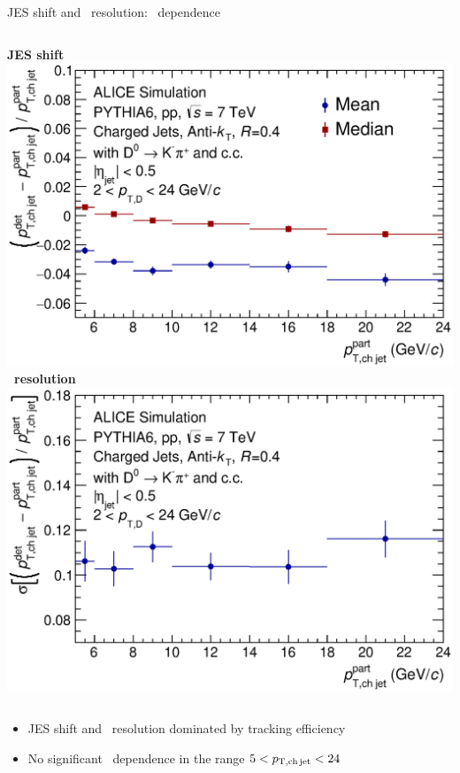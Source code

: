 \documentclass[xcolor={usenames,dvipsnames}]{beamer}
\begin{document}
\begin{frame}{JES shift and \pt\ resolution: \pt\ dependence}
\begin{columns}
\centering
\textbf{JES shift}\\
\includegraphics[width=\textwidth]{img/HQ16_Simulation_EnergyScaleShift}
\centering
\textbf{\ptchjet\ resolution} \\
\includegraphics[width=\textwidth]{img/HQ16_Simulation_Resolution}
\end{columns}
\medskip
\begin{itemize}
\item JES shift and \ptchjet\ resolution dominated by \alert{tracking efficiency}
\item \alert{No significant \pt\ dependence} in the range $5<p_{\mathrm{T,ch\, jet}}<24$ \GeVc
\end{itemize}
\end{frame}
\end{document}
